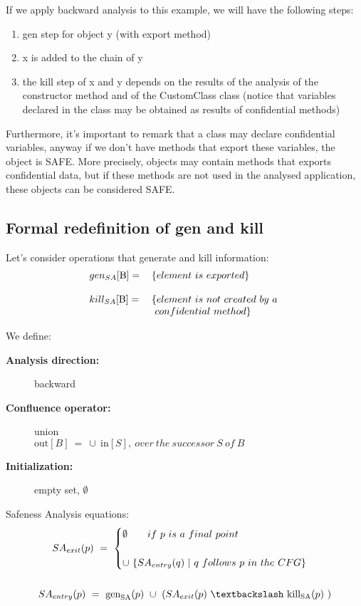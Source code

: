 \documentclass[letterpaper,twocolumn,10pt]{article}
\begin{document}
If we apply backward analysis to this example, we will have the following steps:

\begin{enumerate}
\item gen step for object y (with export method)
\item x is added to the chain of y
\item the kill step of x and y depends on the results of the analysis of the constructor method and of the CustomClass class (notice that variables declared in the class may be obtained as results of confidential methods)
\end{enumerate}

Furthermore, it's important to remark that a class may declare confidential variables, anyway if we don't have methods that export these variables, the object is SAFE. More precisely, objects may contain methods that exports confidential data, but if these methods are not used in the analysed application, these objects can be considered SAFE. \\

\subsection{Formal redefinition of gen and kill}
Let's consider operations that generate and kill information:
\begin{align*}
\begin{tabular}{  l l }
	$ gen_{SA}[\text{B}]= $ & $ \{ element\ is\ exported \} $\\ 
	& \\                  
	$  kill_{SA}[\text{B}]= $ & $ \{ element\ is\ not\ created\ by\ a\ $\\ 
	& $\ confidential\ method \} $ \\
\end{tabular}
\end{align*}

We define: 
\begin{description}
\item[\textbf{Analysis direction:}] backward
\item[\textbf{Confluence operator: }] union\\ $ \text{out}[B]\ =\ \cup\ \text{in}[S],\ over\ the\ successor\ S\ of\ B\  $
\item[\textbf{Initialization: }] empty set, \quad $ \emptyset $
\end{description}

Safeness Analysis equations:
\begin{gather*}
SA_\textrm{$exit$}(p)\ =\ 
\begin{cases}
\emptyset\qquad if\ p\ is\ a\ final\ point\ \\ \\
\cup\ \lbrace SA_\textrm{$entry$}(q)\ |\ q\ follows\ p\ in\ the\ CFG \rbrace 
\end{cases} \\ \\
SA_\textrm{$entry$}(p)\ =\ \text{gen}_\textrm{SA}(p)\ \cup\ (SA_\textrm{$exit$}(p)\ \textbackslash\ \text{kill}_\textrm{SA}(p)\ )
\end{gather*}
\end{document}
